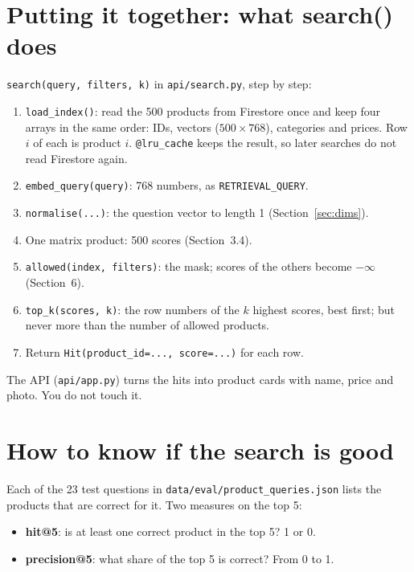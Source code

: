 \documentclass[11pt,a4paper]{article}
\newcommand{\code}[1]{\texttt{#1}}
\begin{document}
\section{Putting it together: what search() does}

\code{search(query, filters, k)} in \code{api/search.py}, step by step:
\begin{enumerate}[leftmargin=1.6em, itemsep=0.25em]
  \item \code{load\_index()}: read the 500 products from Firestore once
        and keep four arrays in the same order: IDs, vectors ($500 \times
        768$), categories and prices. Row $i$ of each is product $i$.
        \code{@lru\_cache} keeps the result, so later searches do not
        read Firestore again.
  \item \code{embed\_query(query)}: 768 numbers, as
        \code{RETRIEVAL\_QUERY}.
  \item \code{normalise(...)}: the question vector to length 1
        (Section~\ref{sec:dims}).
  \item One matrix product: 500 scores (Section~3.4).
  \item \code{allowed(index, filters)}: the mask; scores of the
        others become $-\infty$ (Section~6).
  \item \code{top\_k(scores, k)}: the row numbers of the $k$ highest
        scores, best first; but never more than the number of allowed
        products.
  \item Return \code{Hit(product\_id=..., score=...)} for each row.
\end{enumerate}
The API (\code{api/app.py}) turns the hits into product cards with name,
price and photo. You do not touch it.

\section{How to know if the search is good}

Each of the 23 test questions in \code{data/eval/product\_queries.json}
lists the products that are correct for it. Two measures on the top 5:

\begin{itemize}[leftmargin=1.4em]
  \item \textbf{hit@5}: is at least one correct product in the top 5?
        1 or 0.
  \item \textbf{precision@5}: what share of the top 5 is correct? From 0
        to 1.
\end{itemize}
\end{document}
